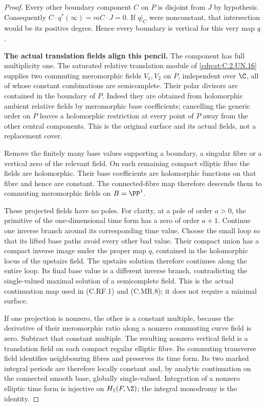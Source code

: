 \begin{proof}
Every other boundary component \(C\) on
\(P\) is disjoint from \(J\) by hypothesis.
Consequently \(C\cdot q^*(\infty)=mC\cdot J=0\).
If \(q|_C\) were nonconstant, that intersection
would be its positive degree. Hence every
boundary is vertical for this very map \(q\).

\par\medskip\noindent\textbf{The actual translation fields align this pencil.}
The component has full multiplicity one.
The saturated relative translation module
of \ref{cdp:st:C.2.UN.16} supplies two commuting meromorphic
fields \(V_1,V_2\) on \(P\), independent over
\(\C\), all of whose constant combinations
are semicomplete. Their polar divisors
are contained in the boundary of \(P\).
Indeed they are obtained from holomorphic
ambient relative fields by meromorphic
base coefficients; cancelling the generic
order on \(P\) leaves a holomorphic
restriction at every point of \(P\)
away from the other central components.
This is the original surface and its
actual fields, not a replacement cover.

Remove the finitely many base values
supporting a boundary, a singular fibre
or a vertical zero of the relevant field.
On each remaining compact elliptic fibre
the fields are holomorphic. Their base
coefficients are holomorphic functions
on that fibre and hence are constant.
The connected-fibre map therefore
descends them to commuting meromorphic
fields on \(B=\PP^1\).

These projected fields have no poles.
For clarity, at a pole of order \(a>0\),
the primitive of the one-dimensional
time form has a zero of order \(a+1\).
Continue one inverse branch around
its corresponding time value. Choose
the small loop so that its lifted
base paths avoid every other bad
value. Their compact union has a
compact inverse image under the proper
map \(q\), contained in the holomorphic
locus of the upstairs field. The
upstairs solution therefore continues
along the entire loop. Its final
base value is a different inverse
branch, contradicting the
single-valued maximal solution of
a semicomplete field. This is the
actual continuation map used in
(C.RF.1) and (C.MR.8); it does
not require a minimal surface.

If one projection is nonzero,
the other is a constant multiple,
because the derivative of their
meromorphic ratio along a nonzero
commuting curve field is zero.
Subtract that constant multiple.
The resulting nonzero vertical
field is a translation field on
each compact regular elliptic fibre.
Its commuting transverse field
identifies neighbouring fibres and
preserves its time form. Its two
marked integral periods are
therefore locally constant and,
by analytic continuation on the
connected smooth base, globally
single-valued. Integration of a
nonzero elliptic time form is
injective on \(H_1(F,\Z)\);
the integral monodromy is the
identity.


\end{proof}
